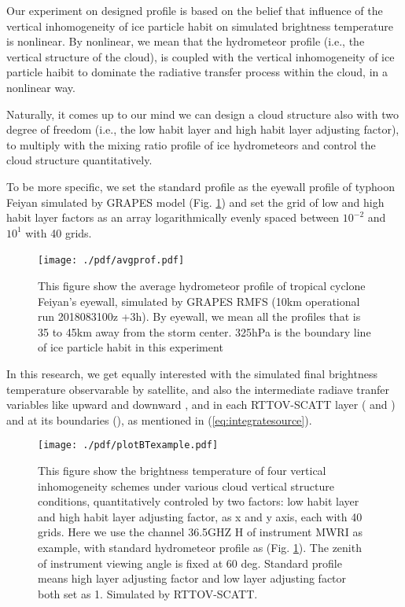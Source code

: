 \documentclass[a4paper]{report}
\begin{document}
Our experiment on designed profile is based on the belief that influence of the vertical inhomogeneity 
of ice particle habit on simulated brightness temperature is nonlinear. By nonlinear, we mean that 
the hydrometeor profile (i.e., the vertical structure of the cloud), is coupled with the vertical inhomogeneity 
of ice particle haibit to dominate the radiative transfer process within the cloud, in a nonlinear way.

Naturally, it comes up to our mind we can design a cloud structure also with two degree of freedom (i.e., 
the low habit layer and high habit layer adjusting factor), to multiply with the mixing ratio profile of
ice hydrometeors and control the cloud structure quantitatively.

To be more specific, we set the standard profile as the eyewall profile of typhoon Feiyan 
simulated by GRAPES model (Fig. \ref{fig:stdprofile}) and set the grid of low and high habit layer factors 
as an array logarithmically evenly spaced between $10^{-2}$ and $10^{1}$ with 40 grids.



\begin{figure}[hb] 
\centering
\texttt{[image: ./pdf/avgprof.pdf]} 
\caption{This figure show the average hydrometeor profile of 
tropical cyclone Feiyan's eyewall, simulated by GRAPES RMFS (10km operational run 2018083100z +3h).
By eyewall, we mean all the profiles that is 35 to 45km away from the storm center.
325hPa is the boundary line of ice particle habit in this experiment}
\label{fig:stdprofile}
\end{figure}

In this research, we get equally interested with the simulated final brightness temperature observarable by satellite,
and also the intermediate radiave tranfer variables like upward and downward ,  and
 in each RTTOV-SCATT layer ( and ) and at its boundaries (), 
as mentioned in (\ref{eq:integratesource}).

\begin{figure}[hb] 
\centering
\texttt{[image: ./pdf/plotBTexample.pdf]}
\caption{This figure show the brightness temperature of four vertical inhomogeneity schemes under various cloud vertical 
structure conditions, quantitatively controled by two factors: low habit layer and high habit layer adjusting factor, 
as x and y axis, each with 40 grids. Here we use the channel 36.5GHZ H of instrument MWRI as example, with standard hydrometeor 
profile as (Fig. \ref{fig:stdprofile}). The zenith of instrument viewing angle is fixed at 60 deg.
Standard profile means high layer adjusting factor and low layer adjusting factor both set as 1.
Simulated by RTTOV-SCATT.}
\label{fig:exBT}
\end{figure}
\end{document}
